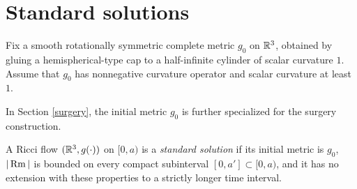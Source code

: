 \section{Standard solutions}

 \label{II.2}

Fix a smooth rotationally symmetric complete metric $g_0$ on ${\mathbb R}^3$, obtained by
gluing a hemispherical-type cap to a half-infinite cylinder of scalar curvature
$1$. Assume that $g_0$ has nonnegative curvature operator and scalar curvature
at least $1$.

\begin{remark}
  \label{rem:kl-standard-solutions-structural-remark-standard-solutions}

In Section \ref{surgery}, the initial metric $g_0$ is further specialized for
the surgery construction.
\end{remark}

\begin{definition}
  \label{def:kl-standard-solutions-standard-solution-definition}

\label{defstandardsolution}
A Ricci flow $({\mathbb R}^3,g(\cdot))$ on $[0,a)$ is a \emph{standard solution} if its
initial metric is $g_0$, $|\operatorname{Rm}|$ is bounded on every compact subinterval
$[0,a']\subset[0,a)$, and it has no extension with these properties to a
strictly longer time interval.
\end{definition}


